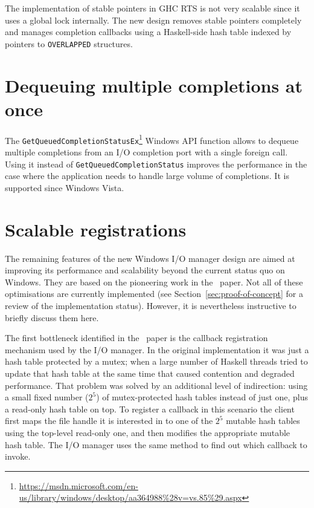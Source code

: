 \documentclass[a4paper,11pt,oneside]{report}
\begin{document}
The implementation of stable pointers in GHC RTS is not very scalable since it
uses a global lock internally. The new design removes stable pointers completely
and manages completion callbacks using a Haskell-side hash table indexed by
pointers to \texttt{OVERLAPPED} structures.


\section{Dequeuing multiple completions at once}

The
\texttt{GetQueuedCompletionStatusEx}\footnote{\url{https://msdn.microsoft.com/en-us/library/windows/desktop/aa364988\%28v=vs.85\%29.aspx}}
Windows API function allows to dequeue multiple completions from an I/O
completion port with a single foreign call. Using it instead of
\texttt{GetQueuedCompletionStatus} improves the performance in the case where
the application needs to handle large volume of completions. It is supported
since Windows Vista.

\section{Scalable registrations}

The remaining features of the new Windows I/O manager design are aimed at
improving its performance and scalability beyond the current status quo on
Windows. They are based on the pioneering work in the~\cite{bib:voellmy} paper.
Not all of these optimisations are currently implemented (see
Section~\ref{sec:proof-of-concept} for a review of the implementation
status). However, it is nevertheless instructive to briefly discuss them here.

The first bottleneck identified in the~\cite{bib:voellmy} paper is the callback
registration mechanism used by the I/O manager. In the original implementation
it was just a hash table protected by a mutex; when a large number of Haskell
threads tried to update that hash table at the same time that caused contention
and degraded performance. That problem was solved by an additional level of
indirection: using a small fixed number ($2^5$) of mutex-protected hash tables
instead of just one, plus a read-only hash table on top. To register a callback
in this scenario the client first maps the file handle it is interested in
to one of the $2^5$ mutable hash tables using the top-level read-only one, and
then modifies the appropriate mutable hash table. The I/O manager uses the same
method to find out which callback to invoke.
\end{document}
